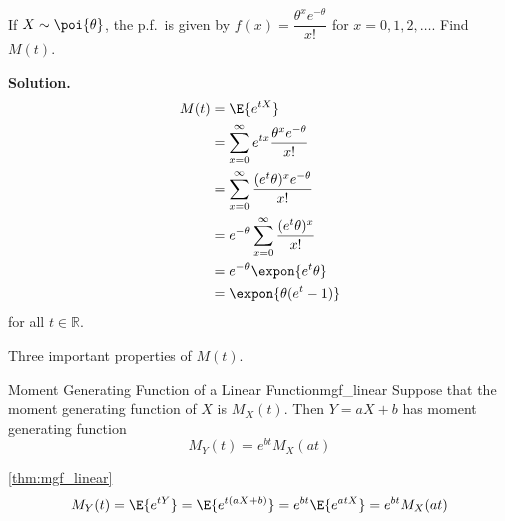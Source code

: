 \begin{Example}{}{}
    If $ X \sim \poi{\theta} $, the p.f.\ is given by
    $ f(x)=\dfrac{\theta^x e^{-\theta}}{x!} $
    for $ x=0,1,2,\ldots $. Find $ M(t) $.

    \textbf{Solution.}
    \begin{align*}
        M(t)
         & =\E{e^{tX}}                                                        \\
         & =\sum\limits_{x=0}^{\infty} e^{tx} \frac{\theta^x e^{-\theta}}{x!} \\
         & =\sum\limits_{x=0}^{\infty} \frac{(e^t \theta)^x e^{-\theta}}{x!}  \\
         & =e^{-\theta}\sum\limits_{x=0}^{\infty} \frac{(e^t \theta)^x}{x!}   \\
         & =e^{-\theta} \expon{e^t \theta}                                    \\
         & =\expon{\theta(e^t-1)}
    \end{align*}
    for all $ t\in\mathbb{R} $.
\end{Example}
Three important properties of $ M(t) $.

\begin{Theorem}{Moment Generating Function of a Linear Function}{mgf_linear}
    Suppose that the moment generating function of $ X $ is $ M_X(t) $.
    Then $ Y=aX+b $ has moment generating function
    \[ M_Y(t)=e^{bt}M_X(at) \]
\end{Theorem}

\begin{Proof}{\ref{thm:mgf_linear}}{}
    \[  M_Y(t)
        =\E{e^{tY}}
        =\E{e^{t(aX+b)}}
        =e^{bt}\E{e^{atX}}
        =e^{bt}M_X(at) \]
\end{Proof}

